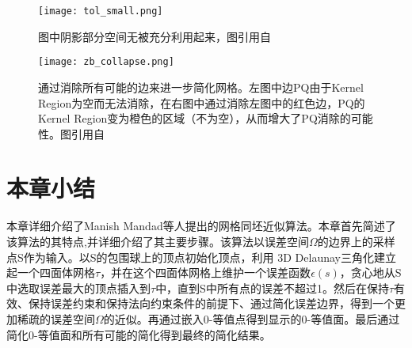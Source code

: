 \begin{figure}[htbp]
    \centering
    \texttt{[image: tol\_small.png]}
    \caption{图中阴影部分空间无被充分利用起来，图引用自\cite{isotopic-appro}}
    \label{fig:tol-small}
\end{figure}

\begin{figure}[htbp]
    \centering
    \texttt{[image: zb\_collapse.png]}
    \caption{通过消除所有可能的边来进一步简化网格。左图中边PQ由于Kernel Region为空而无法消除，在右图中通过消除左图中的红色边，PQ的Kernel Region变为橙色的区域（不为空），从而增大了PQ消除的可能性。图引用自\cite{isotopic-appro}}
    \label{fig:all-edges-collapse}
\end{figure}

\section{本章小结}
本章详细介绍了Manish Mandad等人提出的网格同坯近似算法\cite{isotopic-appro}。本章首先简述了该算法的其特点,并详细介绍了其主要步骤。该算法以误差空间$\Omega$的边界上的采样点S作为输入。以S的包围球上的顶点初始化顶点，利用 3D Delaunay三角化建立起一个四面体网格$\tau$，并在这个四面体网格上维护一个误差函数$\epsilon(s)$，贪心地从S中选取误差最大的顶点插入到$\tau$中，直到S中所有点的误差不超过1。然后在保持$\tau$有效、保持误差约束和保持法向约束条件的前提下、通过简化误差边界，得到一个更加稀疏的误差空间$\Omega$的近似。再通过嵌入0-等值点得到显示的0-等值面。最后通过简化0-等值面和所有可能的简化得到最终的简化结果。



